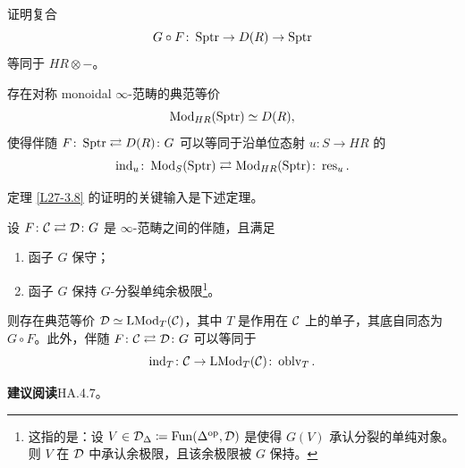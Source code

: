 \begin{exercise}\label{L27-3.7}
证明复合
\[
G\circ F\colon\operatorname{Sptr}\to D(R)\to\operatorname{Sptr}
\]
等同于 $HR\otimes-$。
\end{exercise}

\begin{theorem}[HA.7.1.2.13]\label{L27-3.8}
存在对称 monoidal $\infty$-范畴的典范等价
\[
\operatorname{Mod}_{HR}(\operatorname{Sptr})\simeq D(R),
\]
使得伴随 $F\colon\operatorname{Sptr}\rightleftarrows D(R)\colon G$ 可以等同于沿单位态射 $u\colon S\to HR$ 的
\[
\operatorname{ind}_{u}\colon\operatorname{Mod}_{S}(\operatorname{Sptr})\rightleftarrows\operatorname{Mod}_{HR}(\operatorname{Sptr})\colon\operatorname{res}_{u}.
\]
\end{theorem}



\nitem\label{L27-A.1}
定理 \ref{L27-3.8} 的证明的关键输入是下述定理。

\begin{theorem}\label{L27-A.2}
设 $F\colon\mathcal{C}\rightleftarrows\mathcal{D}\colon G$ 是 $\infty$-范畴之间的伴随，且满足
\begin{enumerate}[label=(\roman*),leftmargin=2.4em,itemsep=0.1em]
\item 函子 $G$ 保守；
\item 函子 $G$ 保持 $G$-分裂单纯余极限\footnote{这指的是：设 $V\in\mathcal{D}_{\Delta}\coloneqq\operatorname{Fun}(\Delta^{\mathrm{op}},\mathcal{D})$ 是使得 $G(V)$ 承认分裂的单纯对象。则 $V$ 在 $\mathcal{D}$ 中承认余极限，且该余极限被 $G$ 保持。}。
\end{enumerate}
则存在典范等价 $\mathcal{D}\simeq\mathrm{LMod}_{T}(\mathcal{C})$，其中 $T$ 是作用在 $\mathcal{C}$ 上的单子，其底自同态为 $G\circ F$。此外，伴随 $F\colon\mathcal{C}\rightleftarrows\mathcal{D}\colon G$ 可以等同于
\[
\operatorname{ind}_{T}\colon\mathcal{C}\to\mathrm{LMod}_{T}(\mathcal{C})\colon\operatorname{oblv}_{T}.
\]
\end{theorem}

\nitem\label{L27-A.3}
\textbf{建议阅读}\quad HA.4.7。

